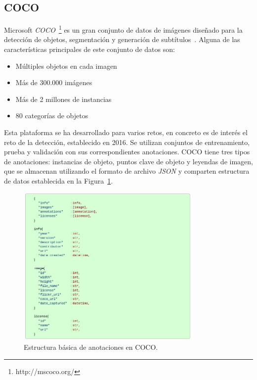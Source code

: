\subsection{COCO}
Microsoft \textit{\ac{COCO}}~\footnote{http://mscoco.org/} es un gran conjunto de datos de imágenes diseñado para la detección de objetos, segmentación y generación de subtítulos~\cite{veit2016cocotext}. Alguna de las características principales de este conjunto de datos son:
	\begin{itemize}
         \item Múltiples objetos en cada imagen
     	 \item Más de 300.000 imágenes
         \item Más de 2 millones de instancias
         \item 80 categorías de objetos
    \end{itemize}
    
Esta plataforma se ha desarrollado para varios retos, en concreto es de interés el reto de la detección, establecido en 2016. Se utilizan conjuntos de entrenamiento, prueba y validación con sus correspondientes anotaciones. \ac{COCO} tiene tres tipos de anotaciones: instancias de objeto, puntos clave de objeto y leyendas de imagen, que se almacenan utilizando el formato de archivo \textit{\ac{JSON}} y comparten estructura de datos establecida en la Figura~\ref{fig.basicStruc}. \\

\begin{figure}[H]
	\begin{center}
		\includegraphics[width=0.8\textwidth]{figures/basic_structure_annotations.png}
		\caption{Estructura básica de anotaciones en \ac{COCO}.}
		\label{fig.basicStruc}
	\end{center}
\end{figure} 

